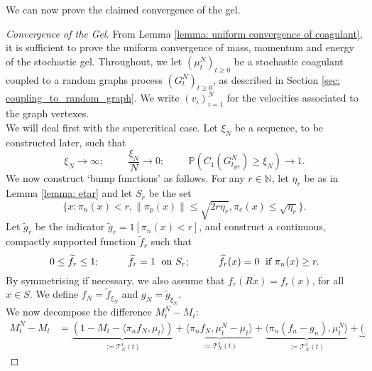   
   We can now prove the claimed convergence of the gel.
   \begin{proof}[Convergence of the Gel] From Lemma \ref{lemma: uniform convergence of coagulant}, it is sufficient to prove the uniform convergence of mass, momentum and energy of the stochastic gel. Throughout, we let $(\mu^N_t)_{t\geq 0}$ be a stochastic coagulant coupled to a random graphs process $(G^N_t)_{t\geq 0}$, as described in Section \ref{sec: coupling_to_random_graph}. We write $(v_i)_{i=1}^N$ for the velocities associated to the graph vertexes. \medskip \\ We will deal first with the supercritical case. Let $\xi_N$ be a sequence, to be constructed later, such that \begin{equation}
       \xi_N\rightarrow \infty; \hspace{1cm} \frac{\xi_N}{N}\rightarrow 0; \hspace{1cm}\mathbb{P}(C_1(G^N_{t_\text{gel}})\geq \xi_N)\rightarrow 1.
   \end{equation}  We now construct `bump functions' as follows.  For any $r \in \mathbb{N}$, let $\eta_r$ be as in Lemma \ref{lemma: etar} and let $S_r$ be the set \begin{equation}\label{eq: choice of xiN}
       \{x: \pi_n(x)< r, \|\pi_p(x)\|\leq \sqrt{2r\eta_r}, \pi_e(x)\leq \sqrt{\eta_r}\}.
   \end{equation} Let $\widetilde{g}_r$ be the indicator $\widetilde{g}_r=1[\pi_n(x)< r]$, and construct a continuous, compactly supported function $\widetilde{f}_r$ such that \begin{equation}
      0\leq \widetilde{f}_r\leq 1;\hspace{1cm} \widetilde{f}_r=1 \hspace{0.1cm} \text{ on } S_r;\hspace{1cm} \widetilde{f}_r(x)=0 \hspace{0.1cm} \text{ if } \pi_n(x)\ge r.
   \end{equation} By symmetrising if necessary, we also assume that $f_r(Rx)=f_r(x)$, for all $x\in S$. We define $f_N=\widetilde{f}_{\xi_N}$ and $g_N=\widetilde{g}_{\xi_N}$. \medskip \\ We now decompose the difference $M^N_t-M_t:$ \begin{equation}\label{eq: decomposition of erorr}\begin{split} M^N_t-M_t &= \underbrace{(1-M_t-\langle \pi_n f_N, \mu_t\rangle)}_{:=\mathcal{T}^1_N(t)} + \underbrace{\langle \pi_n f_N, \mu^N_t-\mu_t\rangle}_{:=\mathcal{T}^2_N(t)} + \underbrace{\langle \pi_n (f_n-g_n), \mu^N_t\rangle}_{:=\mathcal{T}^3_N(t)} +\underbrace{(
}
\end{split}
\end{equation}
\end{proof}

